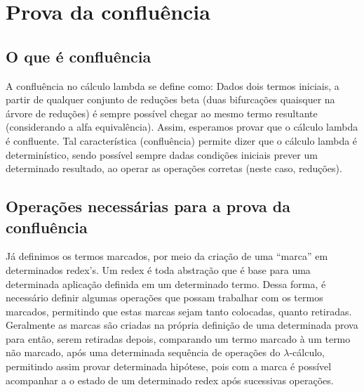 \section{Prova da confluência}



\subsection{O que é confluência}



 A confluência no cálculo lambda se define como: Dados dois termos iniciais,
a partir de qualquer conjunto de reduções beta (duas bifurcações quaisquer na árvore de reduções)
 é sempre possível chegar ao mesmo termo resultante (considerando a alfa equivalência). 
Assim, esperamos provar que o cálculo lambda é confluente. Tal característica (confluência) 
permite dizer que o cálculo lambda é determinístico, sendo possível sempre dadas condições iniciais
prever um determinado resultado, ao operar as operações corretas (neste caso, reduções). 

\subsection{Operações necessárias para a prova da confluência}



 Já definimos os termos marcados, por meio da criação de uma ``marca'' em determinados redex's. Um
redex é toda abstração que é base para uma determinada aplicação definida em um determinado termo. Dessa forma, é
necessário definir algumas operações que possam trabalhar com os termos marcados, permitindo que estas marcas
sejam tanto colocadas, quanto retiradas. Geralmente as marcas são criadas na própria definição de uma determinada prova
para então, serem retiradas depois, comparando um termo marcado à um termo não marcado, após uma determinada
sequência de operações do $\lambda$-cálculo, permitindo assim provar determinada hipótese, pois com a marca
é possível acompanhar a o estado de um determinado redex após sucessivas operações. 

